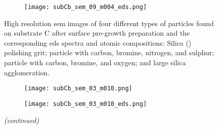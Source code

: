 \begin{figure}
\begin{subfigure}[t]{\textwidth}
          \hfill
          \begin{minipage}[t]{0.43\linewidth}
            \centering
            \texttt{[image: subCb\_sem\_09\_m004\_eds.png]}
          \end{minipage}
          \begin{minipage}[t]{0.11\linewidth}
            \centering
            \atomicTable[&][&][&]
          \end{minipage}
    \end{subfigure}
    \caption[\Ac{sem} images, \ac{eds} spectra, and \ac{eds} atomic compositions of four different types of particles found on substrate C after surface pre-growth preparation.]{High resolution \acf{sem} images of four different types of particles found on substrate C after surface pre-growth preparation and the corresponding \acf{eds} spectra and atomic compositions:  Silica () polishing grit;  particle with carbon, bromine, nitrogen, and sulphur;  particle with carbon, bromine, and oxygen; and  large silica agglomeration.}\label{fig:subCb_sem_w_eds}
\end{figure}
%
\begin{figure}[htbp]
\ContinuedFloat
    \centering
    \begin{subfigure}[t]{\textwidth}
        \caption{}\label{fig:subCb_silica_large}
          \begin{minipage}[t]{0.43\linewidth}
            \centering
            \texttt{[image: subCb\_sem\_03\_m010.png]}
          \end{minipage}
          \hfill
          \begin{minipage}[t]{0.43\linewidth}
            \centering
            \texttt{[image: subCb\_sem\_03\_m010\_eds.png]}
          \end{minipage}
          \begin{minipage}[t]{0.11\linewidth}
            \centering
            \atomicTable[&][&][&]
          \end{minipage}
    \end{subfigure}
    \captionsetup{list=no}
    \caption{\emph{(continued)}}
\end{figure}

